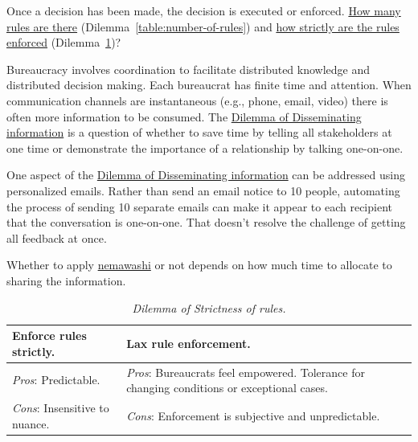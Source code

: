 Once a decision has been made, the decision is executed or enforced. \hyperref[table:number-of-rules]{How many rules are there} (Dilemma~\ref{table:number-of-rules}) and
\hyperref[table:rule-strictness]{how strictly are the rules enforced} (Dilemma~\ref{table:rule-strictness})?

Bureaucracy involves coordination to facilitate distributed knowledge and distributed decision making. Each bureaucrat has finite time and attention. When communication channels are instantaneous (e.g., phone, email, video) there is often more information to be consumed.
The \href{table:disseminate-one-by-one}{Dilemma of Disseminating information} is a question of whether to save time by telling all stakeholders at one time or demonstrate the importance of a relationship by talking one-on-one. 


One aspect of the \href{table:disseminate-one-by-one}{Dilemma of Disseminating information} can be addressed using personalized emails. Rather than send an email notice to 10 people, automating the process of sending 10 separate emails can make it appear to each recipient that the conversation is one-on-one.  That doesn't resolve the challenge of getting all feedback at once.

Whether to apply \href{https://en.wikipedia.org/wiki/Nemawashi}{nemawashi} 
or not depends on how much time to allocate to sharing the information. 

\begin{center}
\begin{table}[H] %
\begin{tabular}{ | m{\dilemmatablewidth}| m{\dilemmatablewidth} | } 
  \hline
  \textbf{Enforce rules strictly.} & 
  \textbf{Lax rule enforcement.} \\ 
  \hline
  \textit{Pros}: Predictable. &
  \textit{Pros}: Bureaucrats feel empowered. Tolerance for changing conditions or exceptional cases. \\
  \hline
  \textit{Cons}: Insensitive to nuance. & 
  \textit{Cons}: Enforcement is subjective and unpredictable.  \\  
  \hline
\end{tabular}
\caption{
\textit{Dilemma of Strictness of rules.}
}
\label{table:rule-strictness}
\end{table}
\end{center}


